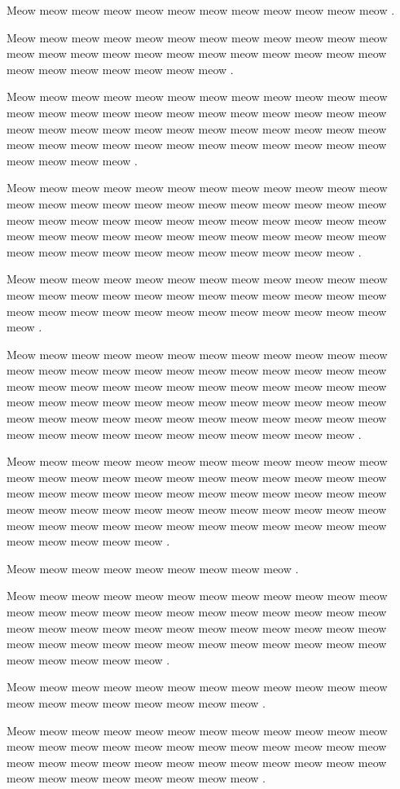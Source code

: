 \documentclass[12pt, a5paper, openany]{book}
\begin{document}
Meow meow meow meow meow meow meow meow meow meow meow meow .

Meow meow meow meow meow meow meow meow meow meow meow meow meow meow meow meow meow meow meow meow meow meow meow meow meow meow meow meow meow meow meow .

Meow meow meow meow meow meow meow meow meow meow meow meow meow meow meow meow meow meow meow meow meow meow meow meow meow meow meow meow meow meow meow meow meow meow meow meow meow meow meow meow meow meow meow meow meow meow meow meow meow meow meow meow .

Meow meow meow meow meow meow meow meow meow meow meow meow meow meow meow meow meow meow meow meow meow meow meow meow meow meow meow meow meow meow meow meow meow meow meow meow meow meow meow meow meow meow meow meow meow meow meow meow meow meow meow meow meow meow meow meow meow meow meow .

Meow meow meow meow meow meow meow meow meow meow meow meow meow meow meow meow meow meow meow meow meow meow meow meow meow meow meow meow meow meow meow meow meow meow meow meow meow .

Meow meow meow meow meow meow meow meow meow meow meow meow meow meow meow meow meow meow meow meow meow meow meow meow meow meow meow meow meow meow meow meow meow meow meow meow meow meow meow meow meow meow meow meow meow meow meow meow meow meow meow meow meow meow meow meow meow meow meow meow meow meow meow meow meow meow meow meow meow meow meow .

Meow meow meow meow meow meow meow meow meow meow meow meow meow meow meow meow meow meow meow meow meow meow meow meow meow meow meow meow meow meow meow meow meow meow meow meow meow meow meow meow meow meow meow meow meow meow meow meow meow meow meow meow meow meow meow meow meow meow meow meow meow meow meow meow meow .

Meow meow meow meow meow meow meow meow meow .

Meow meow meow meow meow meow meow meow meow meow meow meow meow meow meow meow meow meow meow meow meow meow meow meow meow meow meow meow meow meow meow meow meow meow meow meow meow meow meow meow meow meow meow meow meow meow meow meow meow meow meow meow meow .

Meow meow meow meow meow meow meow meow meow meow meow meow meow meow meow meow meow meow meow meow .

Meow meow meow meow meow meow meow meow meow meow meow meow meow meow meow meow meow meow meow meow meow meow meow meow meow meow meow meow meow meow meow meow meow meow meow meow meow meow meow meow meow meow meow meow .
\end{document}
